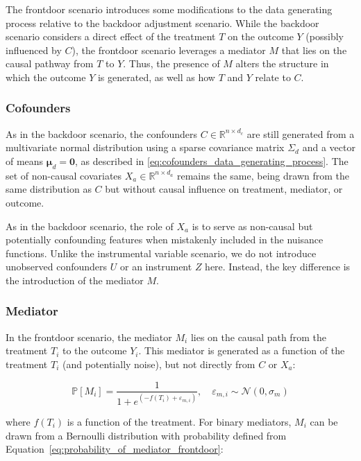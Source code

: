 \documentclass{article}
\numberwithin{equation}{section}
\begin{document}
The frontdoor scenario introduces some modifications to the data generating process relative to the backdoor adjustment scenario. While the backdoor scenario considers a direct effect of the treatment $T$ on the outcome $Y$ (possibly influenced by $C$), the frontdoor scenario leverages a mediator $M$ that lies on the causal pathway from $T$ to $Y$. Thus, the presence of $M$ alters the structure in which the outcome $Y$ is generated, as well as how $T$ and $Y$ relate to $C$.

\subsubsection{Cofounders}

As in the backdoor scenario, the confounders $C \in \mathbb{R}^{n \times d_c}$ are still generated from a multivariate normal distribution using a sparse covariance matrix $\Sigma_d$ and a vector of means $\boldsymbol{\mu}_d = \mathbf{0}$, as described in \eqref{eq:cofounders_data_generating_process}. The set of non-causal covariates $X_a \in \mathbb{R}^{n \times d_a}$ remains the same, being drawn from the same distribution as $C$ but without causal influence on treatment, mediator, or outcome.

As in the backdoor scenario, the role of $X_a$ is to serve as non-causal but potentially confounding features when mistakenly included in the nuisance functions. Unlike the instrumental variable scenario, we do not introduce unobserved confounders $U$ or an instrument $Z$ here. Instead, the key difference is the introduction of the mediator $M$.

\subsubsection{Mediator}

In the frontdoor scenario, the mediator $M_i$ lies on the causal path from the treatment $T_i$ to the outcome $Y_i$. This mediator is generated as a function of the treatment $T_i$ (and potentially noise), but not directly from $C$ or $X_a$:

\begin{equation}
    \mathbb{P}[M_i] = \frac{1}{1 + e^{(-f(T_i) + \varepsilon_{m, i})}}, 
    \quad \varepsilon_{m, i} \sim \mathcal{N}(0, \sigma_m)
    \label{eq:probability_of_mediator_frontdoor}
\end{equation}

where $f(T_i)$ is a function of the treatment. For binary mediators, $M_i$ can be drawn from a Bernoulli distribution with probability defined from Equation~\eqref{eq:probability_of_mediator_frontdoor}:
\end{document}
